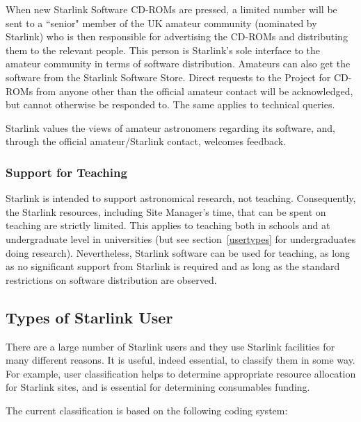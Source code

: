 \documentclass[twoside,11pt]{article}
\begin{document}
When new Starlink Software CD-ROMs are pressed, a limited number will be
sent to a ``senior" member of the UK amateur community (nominated by Starlink)
who is then responsible for advertising the CD-ROMs and distributing them to the
relevant people.
This person is Starlink's sole interface to the amateur community in terms of
software distribution.
Amateurs can also get the software from the Starlink Software Store.
Direct requests to the Project for CD-ROMs from anyone other than the official
amateur contact will be acknowledged, but cannot otherwise be responded to.
The same applies to technical queries.

Starlink values the views of amateur astronomers regarding its software, and,
through the official amateur/Starlink contact, welcomes feedback.

\subsubsection{\label{teaching}Support for Teaching}

Starlink is intended to support astronomical research, not teaching.
Consequently, the Starlink resources, including Site Manager's time, that can
be spent on teaching are strictly limited.
This applies to teaching both in schools and at undergraduate level in
universities (but see section~\ref{usertypes} for undergraduates doing
research).
Nevertheless, Starlink software can be used for teaching, as long as no
significant support from Starlink is required and as long as the standard
restrictions on software distribution are observed.

\subsection{\label{usertypes}Types of Starlink User}

There are a large number of Starlink users and they use Starlink facilities
for many different reasons.
It is useful, indeed essential, to classify them in some way.
For example, user classification helps to determine appropriate resource
allocation for Starlink sites, and is essential for determining consumables
funding.

The current classification is based on the following coding system:
\end{document}
